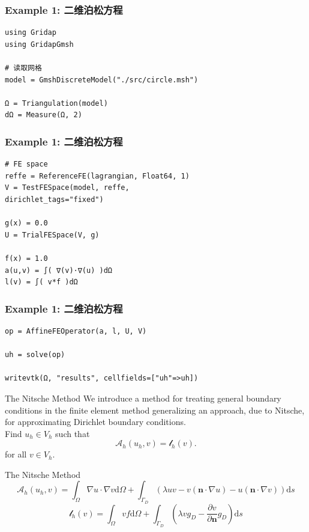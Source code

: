 \documentclass[lang=en,aspectratio=43,theme=default,logo=on]{simplebeamer}
\begin{document}
\begin{frame}[fragile]
    \frametitle{Example 1: 二维泊松方程}
    \begin{verbatim}
using Gridap
using GridapGmsh

# 读取网格
model = GmshDiscreteModel("./src/circle.msh")

Ω = Triangulation(model)
dΩ = Measure(Ω, 2)
    \end{verbatim}
\end{frame}

\begin{frame}[fragile]
    \frametitle{Example 1: 二维泊松方程}
    \begin{verbatim}
# FE space
reffe = ReferenceFE(lagrangian, Float64, 1)
V = TestFESpace(model, reffe,
dirichlet_tags="fixed")

g(x) = 0.0
U = TrialFESpace(V, g)

f(x) = 1.0
a(u,v) = ∫( ∇(v)⋅∇(u) )dΩ
l(v) = ∫( v*f )dΩ
    \end{verbatim}
\end{frame}

\begin{frame}[fragile]
    \frametitle{Example 1: 二维泊松方程}
    \begin{verbatim}
op = AffineFEOperator(a, l, U, V)

uh = solve(op)

writevtk(Ω, "results", cellfields=["uh"=>uh])
    \end{verbatim}
\end{frame}

\begin{frame}{The Nitsche Method}
    We introduce a method for treating general boundary conditions in the finite element method generalizing an approach, due to Nitsche, for approximating Dirichlet boundary conditions. \\
    Find $u_h \in V_h$ such that
    \begin{equation*}
        \mathcal{A}_h(u_h,v)=\mathcal{l}_h(v).
    \end{equation*}
    for all $v \in V_h$. \\
\end{frame}

\begin{frame}{The Nitsche Method}
    \begin{equation*}
        \mathcal{A}_h(u_h,v) = \int_{\Omega}{\nabla u \cdot \nabla v}\mathrm{d}\Omega + \int_{\Gamma_D}{\left( \lambda uv-v(\mathbf{n}\cdot \nabla u) -u(\mathbf{n}\cdot \nabla v)\right) }\mathrm{d}s
    \end{equation*}
    \begin{equation*}
        \mathcal{l}_h(v)=\int_{\Omega}{vf}\mathrm{d}\Omega  + \int_{\Gamma_D}{\left( \lambda vg_D-\dfrac{\partial v}{\partial \mathbf{n}}g_D \right) }\mathrm{d}s
    \end{equation*}
\end{frame}
\end{document}
